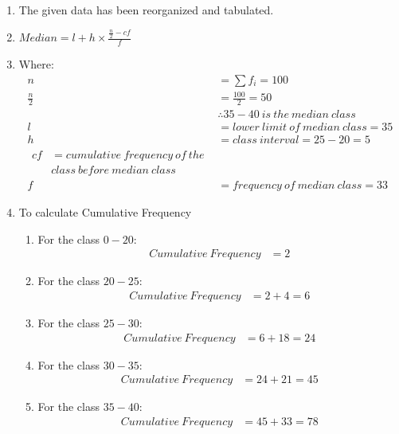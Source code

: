 \renewcommand{\theequation}{\theenumi}

\begin{enumerate}

\item The given data has been reorganized and tabulated.

\item $Median = l + h \times \frac{\frac{n}{2} - cf}{f} $

\item Where:
\begin{align*}
n &= \sum f_i = 100 \\
\frac{n}{2} &= \frac{100}{2} = 50\\
&\therefore 35-40\ is\ the\ median\ class\\
l &= lower\ limit\ of\ median\ class = 35\\
h &= class\ interval = 25 - 20 = 5 \\
\begin{split}
cf &= cumulative\ frequency\ of\ the \\
&class\ before\ median\ class 
\end{split}\\
f &= frequency\ of\ median\ class = 33
\end{align*}

\item To calculate Cumulative Frequency 
\begin{enumerate}

\item For the class $0-20$:
\begin{align*}
Cumulative\ Frequency &= 2
\end{align*}

\item For the class $20-25$:
\begin{align*}
Cumulative\ Frequency &= 2 + 4 = 6
\end{align*}

\item For the class $25-30$:
\begin{align*}
Cumulative\ Frequency &= 6 + 18 = 24 
\end{align*}

\item For the class $30-35$:
\begin{align*}
Cumulative\ Frequency &= 24 + 21 = 45  
\end{align*}

\item For the class $35-40$:
\begin{align*}
Cumulative\ Frequency &= 45 + 33 = 78
\end{align*}


\end{enumerate}
\end{enumerate}
